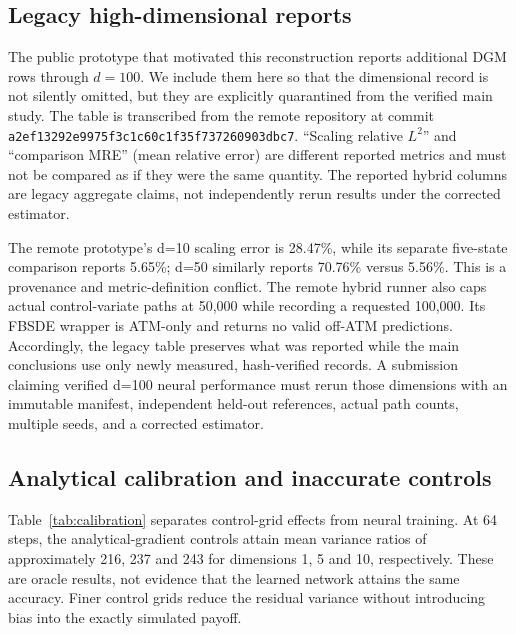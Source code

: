 \documentclass[10pt]{article}
\begin{document}
\subsection{Legacy high-dimensional reports}
\label{sec:legacy-highdim}
The public prototype that motivated this reconstruction reports additional DGM
rows through $d=100$. We include them here so that the dimensional record is not
silently omitted, but they are explicitly quarantined from the verified main
study. The table is transcribed from the remote repository at commit
\texttt{a2ef13292e9975f3c1c60c1f35f737260903dbc7}. ``Scaling relative $L^2$'' and
``comparison MRE'' (mean relative error) are different reported metrics and must
not be compared as if they were the same quantity. The reported hybrid columns
are legacy aggregate claims, not independently rerun results under the corrected
estimator.

\begin{table}[ht]
\centering\small

\caption{High-dimensional values reported by the public prototype. These rows
are included for completeness and provenance, not as verified evidence. No
values were fabricated or statistically imputed. The d=10 discrepancy between
the two reported error columns illustrates why the rows are not pooled with the
new study.}
\label{tab:legacy-highdim}
\end{table}

The remote prototype's d=10 scaling error is 28.47\%, while its separate
five-state comparison reports 5.65\%; d=50 similarly reports 70.76\% versus
5.56\%. This is a provenance and metric-definition conflict. The remote hybrid
runner also caps actual control-variate paths at 50,000 while recording a
requested 100,000. Its FBSDE wrapper is ATM-only and returns no valid off-ATM
predictions. Accordingly, the legacy table preserves what was reported while
the main conclusions use only newly measured, hash-verified records. A
submission claiming verified d=100 neural performance must rerun those
dimensions with an immutable manifest, independent held-out references, actual
path counts, multiple seeds, and a corrected estimator.

\subsection{Analytical calibration and inaccurate controls}
Table~\ref{tab:calibration} separates control-grid effects from neural training.
At 64 steps, the analytical-gradient controls attain mean variance ratios
of approximately 216, 237 and 243 for dimensions 1, 5 and 10, respectively.
These are oracle results, not evidence that the learned network attains the
same accuracy. Finer control grids reduce the residual variance without
introducing bias into the exactly simulated payoff.
\end{document}
